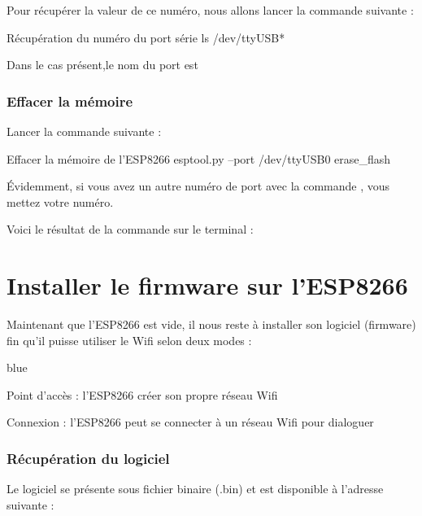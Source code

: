 Pour récupérer la valeur de ce numéro, nous allons lancer la commande suivante : 

\begin{Bash}{Récupération du numéro du port série}
ls /dev/ttyUSB*
\end{Bash}


Dans le cas présent,le nom du port est 

\subsection{Effacer la mémoire}

Lancer la commande suivante : 
\begin{Bash}{Effacer la mémoire de l'ESP8266}
esptool.py --port /dev/ttyUSB0 erase_flash
\end{Bash}

Évidemment, si vous avez un autre numéro de port avec la commande , vous mettez votre numéro.

Voici le résultat de la commande sur le terminal : 



\chapter{Installer le firmware sur l'ESP8266}

Maintenant que l'ESP8266 est vide, il nous reste à installer son logiciel (firmware) fin qu'il puisse utiliser le Wifi selon 
deux modes : 

\begin{items}{blue}{\Triangle}
    \item Point d'accès : l'ESP8266 créer son propre réseau Wifi
    \item Connexion : l'ESP8266 peut se connecter à un réseau Wifi pour dialoguer
\end{items}

\subsection{Récupération du logiciel}

Le logiciel se présente sous fichier binaire (.bin) et est disponible à l'adresse suivante : \\


